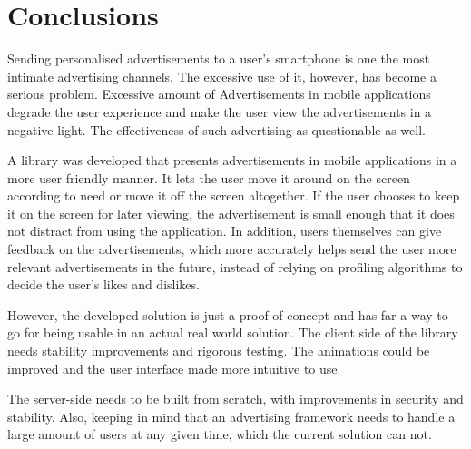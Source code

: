

\chapter{Conclusions} %


\ifpdf
    \graphicspath{{X/figures/PNG/}{X/figures/PDF/}{X/figures/}}
\else
    \graphicspath{{X/figures/EPS/}{X/figures/}}
\fi


Sending personalised advertisements to a user's smartphone is one the most intimate advertising channels. The excessive use of it, however, has become a serious problem. Excessive amount of Advertisements in mobile applications degrade the user experience and make the user view the advertisements in a negative light. The effectiveness of such advertising as questionable as well.

A library was developed that presents advertisements in mobile applications in a more user friendly manner. It lets the user move it around on the screen according to need or move it off the screen altogether. If the user chooses to keep it on the screen for later viewing, the advertisement is small enough that it does not distract from using the application. In addition, users themselves can give feedback on the advertisements, which more accurately helps send the user more relevant advertisements in the future, instead of relying on profiling algorithms to decide the user's likes and dislikes.

However, the developed solution is just a proof of concept and has far a way to go for being usable in an actual real world solution. The client side of the library needs stability improvements and rigorous testing. The animations could be improved and the user interface made more intuitive to use.

The server-side needs to be built from scratch, with improvements in security and stability. Also, keeping in mind that an advertising framework needs to handle a large amount of users at any given time, which the current solution can not.

